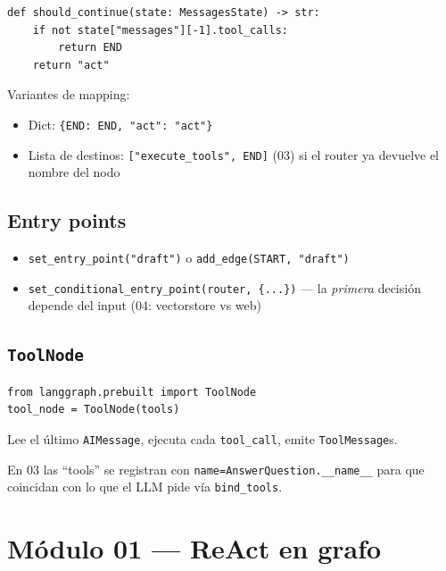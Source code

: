 \documentclass[11pt,a4paper]{article}
\begin{document}
\begin{howto}[title=Router típico tras un LLM con tools]
\begin{lstlisting}
def should_continue(state: MessagesState) -> str:
    if not state["messages"][-1].tool_calls:
        return END
    return "act"
\end{lstlisting}
\end{howto}

Variantes de mapping:
\begin{itemize}[leftmargin=*,itemsep=1pt]
  \item Dict: \texttt{\{END: END, "act": "act"\}}
  \item Lista de destinos: \texttt{["execute\_tools", END]} (03) si el router ya devuelve el nombre del nodo
\end{itemize}

\subsection{Entry points}
\begin{itemize}[leftmargin=*,itemsep=1pt]
  \item \texttt{set\_entry\_point("draft")} o \texttt{add\_edge(START, "draft")}
  \item \texttt{set\_conditional\_entry\_point(router, \{...\})} --- la \emph{primera} decisión depende del input (04: vectorstore vs web)
\end{itemize}

\subsection{\texttt{ToolNode}}
\begin{lstlisting}
from langgraph.prebuilt import ToolNode
tool_node = ToolNode(tools)
\end{lstlisting}
Lee el último \texttt{AIMessage}, ejecuta cada \texttt{tool\_call}, emite \texttt{ToolMessage}s.

\begin{tip}[title=Nombre de la tool = nombre del tool\_call]
En 03 las ``tools'' se registran con \texttt{name=AnswerQuestion.\_\_name\_\_}
para que coincidan con lo que el LLM pide vía \texttt{bind\_tools}.
\end{tip}

\section{Módulo 01 --- ReAct en grafo}
\label{sec:react}
\end{document}
